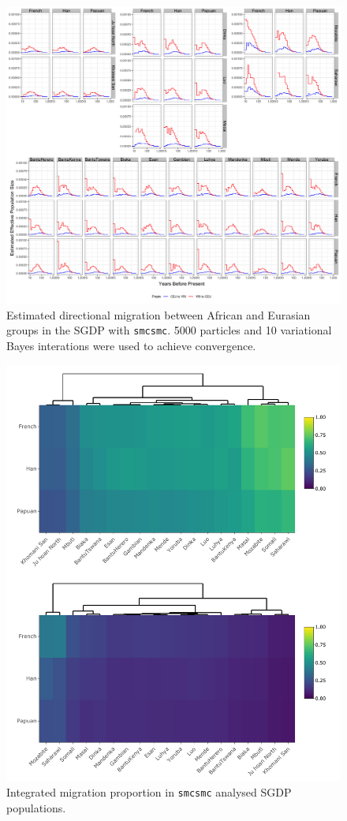 \documentclass{article}
\begin{document}
\begin{figure}
	\centering
	\includegraphics[width=\linewidth]{../plot/sgdp_mig.png}
	\caption{Estimated directional migration between African and Eurasian groups in the SGDP with {\tt smcsmc}. 5000 particles and 10 variational Bayes interations were used to achieve convergence.}	
	\label{sgdp_mig}
\end{figure}

\begin{figure}
	\centering
	\includegraphics[width=\textwidth]{../plot/sgdp_heatmap_figure.pdf}
	\caption{Integrated migration proportion in {\tt smcsmc} analysed SGDP populations.}
	\label{sgdp_heatmap}
\end{figure}
\end{document}
